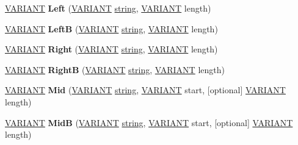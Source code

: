 \begin{DoxyCompactItemize}
\hyperlink{structtag_v_a_r_i_a_n_t}{V\+A\+R\+I\+A\+NT} {\bfseries Left} (\hyperlink{structtag_v_a_r_i_a_n_t}{V\+A\+R\+I\+A\+NT} \hyperlink{structstring}{string}, \hyperlink{structtag_v_a_r_i_a_n_t}{V\+A\+R\+I\+A\+NT} length)
\item 
\mbox{\label{interface_v_b_script___global_1_1_global_obj_a06dc431ea8f965a49dcf4fdea0d487e1}} 
\hyperlink{structtag_v_a_r_i_a_n_t}{V\+A\+R\+I\+A\+NT} {\bfseries LeftB} (\hyperlink{structtag_v_a_r_i_a_n_t}{V\+A\+R\+I\+A\+NT} \hyperlink{structstring}{string}, \hyperlink{structtag_v_a_r_i_a_n_t}{V\+A\+R\+I\+A\+NT} length)
\item 
\mbox{\label{interface_v_b_script___global_1_1_global_obj_a948f8263190493d474b85facb51e5ef0}} 
\hyperlink{structtag_v_a_r_i_a_n_t}{V\+A\+R\+I\+A\+NT} {\bfseries Right} (\hyperlink{structtag_v_a_r_i_a_n_t}{V\+A\+R\+I\+A\+NT} \hyperlink{structstring}{string}, \hyperlink{structtag_v_a_r_i_a_n_t}{V\+A\+R\+I\+A\+NT} length)
\item 
\mbox{\label{interface_v_b_script___global_1_1_global_obj_a5048b47a7fd5597db024fd252c71ef84}} 
\hyperlink{structtag_v_a_r_i_a_n_t}{V\+A\+R\+I\+A\+NT} {\bfseries RightB} (\hyperlink{structtag_v_a_r_i_a_n_t}{V\+A\+R\+I\+A\+NT} \hyperlink{structstring}{string}, \hyperlink{structtag_v_a_r_i_a_n_t}{V\+A\+R\+I\+A\+NT} length)
\item 
\mbox{\label{interface_v_b_script___global_1_1_global_obj_aaf44d6be99b25dac01ba0f5178205838}} 
\hyperlink{structtag_v_a_r_i_a_n_t}{V\+A\+R\+I\+A\+NT} {\bfseries Mid} (\hyperlink{structtag_v_a_r_i_a_n_t}{V\+A\+R\+I\+A\+NT} \hyperlink{structstring}{string}, \hyperlink{structtag_v_a_r_i_a_n_t}{V\+A\+R\+I\+A\+NT} start, \mbox{[}optional\mbox{]} \hyperlink{structtag_v_a_r_i_a_n_t}{V\+A\+R\+I\+A\+NT} length)
\item 
\mbox{\label{interface_v_b_script___global_1_1_global_obj_a59bf811c3d5c7d3d9cc69880a68a5be0}} 
\hyperlink{structtag_v_a_r_i_a_n_t}{V\+A\+R\+I\+A\+NT} {\bfseries MidB} (\hyperlink{structtag_v_a_r_i_a_n_t}{V\+A\+R\+I\+A\+NT} \hyperlink{structstring}{string}, \hyperlink{structtag_v_a_r_i_a_n_t}{V\+A\+R\+I\+A\+NT} start, \mbox{[}optional\mbox{]} \hyperlink{structtag_v_a_r_i_a_n_t}{V\+A\+R\+I\+A\+NT} length)

\end{DoxyCompactItemize}
